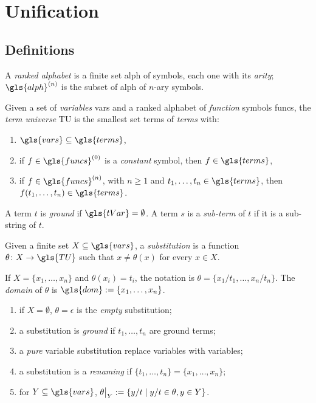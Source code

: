 
\chapter{Unification}

\section{Definitions}

\begin{dfn}
  A \emph{ranked alphabet} is a finite set \gls{alph} of symbols, each one with its \emph{arity}; \(\gls{alph}^{(n)}\) is the subset of \gls{alph} of \(n\)-ary symbols.
\end{dfn}

\begin{dfn}
  Given a set of \emph{variables} \gls{vars} and a ranked alphabet of \emph{function} symbols \gls{funcs}, the \emph{term universe} \gls{TU} is the smallest set \gls{terms} of \emph{terms} with:
  \begin{enumerate}
      \item \(\gls{vars} \subseteq \gls{terms}\),
      \item if \(f \in \gls{funcs}^{(0)}\) is a \emph{constant} symbol, then \(f \in \gls{terms}\),
      \item if \(f \in \gls{funcs}^{(n)}\), with \(n \ge 1\) and \(t_1,\dotsc,t_n \in \gls{terms}\), then \(f(t_1,\dotsc,t_n) \in \gls{terms}\).
  \end{enumerate}
  A term \(t\) is \emph{ground} if \(\gls{tVar} = \emptyset\).
  A term \(s\) is a \emph{sub-term} of \(t\) if it is a sub-string of \(t\).
\end{dfn}

\begin{dfn}[Substitution]
    Given a finite set \(X \subseteq \gls{vars}\), a \emph{substitution} is a function \(\theta \colon X \to \gls{TU}\) such that \(x \ne \theta(x)\) for every \(x \in X\).

    If \(X = \lbrace x_1,\dotsc,x_n \rbrace\) and \(\theta(x_i) = t_i\), the notation is \(\theta = \lbrace x_1/t_1,\dotsc,x_n/t_n \rbrace\).
    The \emph{domain} of \(\theta\) is \(\gls{dom} := \lbrace x_1,\dotsc,x_n \rbrace\).
    \begin{enumerate}
        \item if \(X = \emptyset\), \(\theta = \epsilon\) is the \emph{empty} substitution;
        \item a substitution is \emph{ground} if \(t_1,\dotsc,t_n\) are ground terms;
        \item a \emph{pure} variable substitution replace variables with variables;
        \item a substitution is a \emph{renaming} if \(\lbrace t_1,\dotsc,t_n \rbrace = \lbrace x_1,\dotsc,x_n \rbrace\);
        \item for \(Y \subseteq \gls{vars}\), \(\restr{\theta}{Y} := \lbrace y/t \mid y/t \in \theta, y \in Y \rbrace \).
    \end{enumerate} 
\end{dfn}

